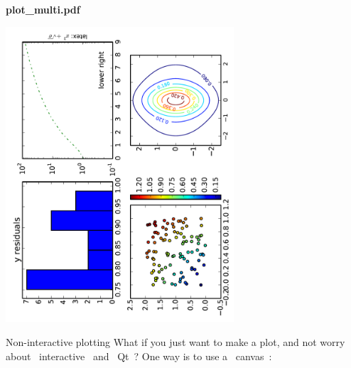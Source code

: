 \documentclass[10pt, t]{beamer}
\let\verb=\codeDelimTwiddles
\let\alert=\textbf
\begin{document}
\begin{frame}[label=sec-3-24]{\alert{plot\_multi.pdf}}
\begin{center}
\includegraphics[angle=-90,width=8.5cm]{./figures/plot_multi.pdf}
\end{center}
\end{frame}
\begin{frame}[fragile,label=sec-3-25]{Non-interactive plotting}
 What if you just want to make a plot, and not worry about \verb~interactive~ and \verb~Qt~?  One
way is to use a \verb~canvas~:

%
%
\end{frame}
\end{document}
